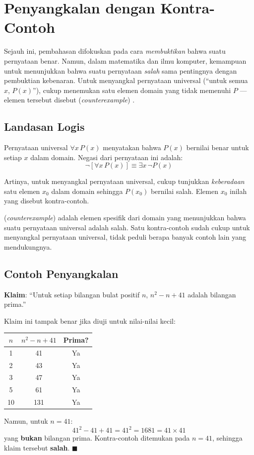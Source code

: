 \section{Penyangkalan dengan Kontra-Contoh}

Sejauh ini, pembahasan difokuskan pada cara \emph{membuktikan} bahwa suatu pernyataan benar. Namun, dalam matematika dan ilmu komputer, kemampuan untuk menunjukkan bahwa suatu pernyataan \emph{salah} sama pentingnya dengan pembuktian kebenaran. Untuk menyangkal pernyataan universal (``untuk semua $x$, $P(x)$''), cukup menemukan satu elemen domain yang tidak memenuhi $P$ --- elemen tersebut disebut  (\textit{counterexample}) \cite{rosen2019}.

\subsection{Landasan Logis}

Pernyataan universal $\forall x\, P(x)$ menyatakan bahwa $P(x)$ bernilai benar untuk setiap $x$ dalam domain. Negasi dari pernyataan ini adalah:
\[ \neg [\forall x\, P(x)] \equiv \exists x\, \neg P(x) \]

Artinya, untuk menyangkal pernyataan universal, cukup tunjukkan \emph{keberadaan} satu elemen $x_0$ dalam domain sehingga $P(x_0)$ bernilai salah. Elemen $x_0$ inilah yang disebut kontra-contoh.

\begin{definisi}
 (\textit{counterexample}) adalah elemen spesifik dari domain yang menunjukkan bahwa suatu pernyataan universal adalah salah. Satu kontra-contoh sudah cukup untuk menyangkal pernyataan universal, tidak peduli berapa banyak contoh lain yang mendukungnya.
\end{definisi}

\subsection{Contoh Penyangkalan}

\begin{contoh}
\textbf{Klaim}: ``Untuk setiap bilangan bulat positif $n$, $n^2 - n + 41$ adalah bilangan prima.''

Klaim ini tampak benar jika diuji untuk nilai-nilai kecil:
\begin{center}
\renewcommand{\arraystretch}{1.2}
\begin{tabular}{|c|c|c|}
\hline
$n$ & $n^2 - n + 41$ & Prima? \\ \hline
1 & 41 & Ya \\ \hline
2 & 43 & Ya \\ \hline
3 & 47 & Ya \\ \hline
5 & 61 & Ya \\ \hline
10 & 131 & Ya \\ \hline
\end{tabular}
\end{center}

Namun, untuk $n = 41$:
\[ 41^2 - 41 + 41 = 41^2 = 1681 = 41 \times 41 \]
yang \textbf{bukan} bilangan prima. Kontra-contoh ditemukan pada $n = 41$, sehingga klaim tersebut \textbf{salah}. $\blacksquare$
\end{contoh}

